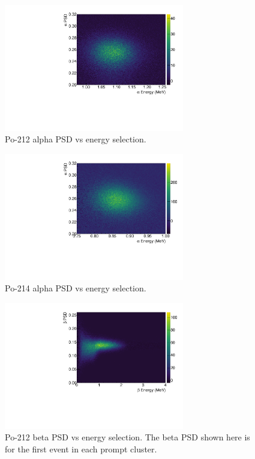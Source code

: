 \begin{figure}[!h]
\centering
\includegraphics[width=0.7\textwidth]{figures/BiPo212AlphaPSD.pdf}
\caption{\label{fig:apsd212}Po-212 alpha PSD vs energy selection.}
\end{figure}
\begin{figure}[!h]
\centering
\includegraphics[width=0.7\textwidth]{figures/BiPo214AlphaPSD.pdf}
\caption{\label{fig:apsd214}Po-214 alpha PSD vs energy selection.}
\end{figure}
\begin{figure}[!b]
\centering
\includegraphics[width=0.7\textwidth]{figures/BiPo212BetaPSD.pdf}
\caption{\label{fig:bpsd212}Po-212 beta PSD vs energy selection. The beta PSD shown here is for the first event in each prompt cluster.}
\end{figure}
